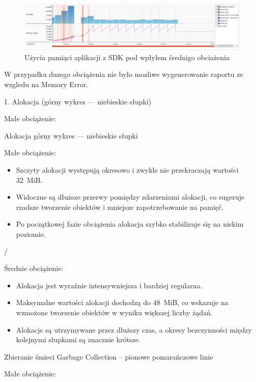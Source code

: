 \documentclass[runningheads,12pt]{llncs}
\begin{document}
\begin{figure}
    \includegraphics[width=\linewidth]{images/library-memory-midle-graph.jpg}
    \caption{Użycia pamiąci aplikacji z SDK pod wpłyłem średnigo obciażenia} \label{fig1}
\end{figure}

W przypadku duzego obciążenia nie było mozliwe wygenerowanie raportu ze wzgledu na Memory Error.

1. Alokacja (górny wykres — niebieskie słupki)

Małe obciążenie:

Alokacja górny wykres — niebieskie słupki

Małe obciążenie:


\begin{itemize}
  \item Szczyty alokacji występują okresowo i zwykle nie przekraczają wartości 32~MiB.
  \item Widoczne są dłuższe przerwy pomiędzy zdarzeniami alokacji, co sugeruje rzadsze tworzenie obiektów i mniejsze zapotrzebowanie na pamięć.
  \item Po początkowej fazie obciążenia alokacja szybko stabilizuje się na niskim poziomie.
\end{itemize}/

Średnie obciążenie:

\begin{itemize}
  \item Alokacja jest wyraźnie intensywniejsza i bardziej regularna.
  \item Maksymalne wartości alokacji dochodzą do 48~MiB, co wskazuje na wzmożone tworzenie obiektów w wyniku większej liczby żądań.
  \item Alokacje są utrzymywane przez dłuższy czas, a okresy bezczynności między kolejnymi słupkami są znacznie krótsze.
\end{itemize}

\vspace{0.5cm}

Zbieranie śmieci Garbage Collection – pionowe pomarańczowe linie

Małe obciążenie:
\end{document}
